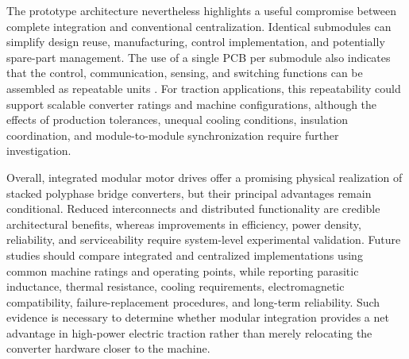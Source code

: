 The prototype architecture nevertheless highlights a useful compromise between complete integration and conventional centralization. Identical submodules can simplify design reuse, manufacturing, control implementation, and potentially spare-part management. The use of a single PCB per submodule also indicates that the control, communication, sensing, and switching functions can be assembled as repeatable units \cite{Jin2017}. For traction applications, this repeatability could support scalable converter ratings and machine configurations, although the effects of production tolerances, unequal cooling conditions, insulation coordination, and module-to-module synchronization require further investigation. %

Overall, integrated modular motor drives offer a promising physical realization of stacked polyphase bridge converters, but their principal advantages remain conditional. Reduced interconnects and distributed functionality are credible architectural benefits, whereas improvements in efficiency, power density, reliability, and serviceability require system-level experimental validation. Future studies should compare integrated and centralized implementations using common machine ratings and operating points, while reporting parasitic inductance, thermal resistance, cooling requirements, electromagnetic compatibility, failure-replacement procedures, and long-term reliability. Such evidence is necessary to determine whether modular integration provides a net advantage in high-power electric traction rather than merely relocating the converter hardware closer to the machine.
